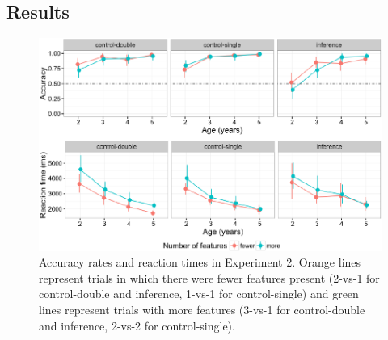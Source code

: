 \documentclass[a4paper,man,apacite,floatsintext]{apa6}
\newenvironment{CodeChunk}{}{}
\begin{document}
\subsection{Results}\label{results-1}

\begin{CodeChunk}
\begin{figure}[H]

{\centering \includegraphics{figs/ipaccrt-1} 

}

\caption[Accuracy rates and reaction times in Experiment 2]{Accuracy rates and reaction times in Experiment 2. Orange lines represent trials in which there were fewer features present (2-vs-1 for control-double and inference, 1-vs-1 for control-single) and green lines represent trials with more features (3-vs-1 for control-double and inference, 2-vs-2 for control-single).}\label{fig:ipaccrt}
\end{figure}
\end{CodeChunk}
\end{document}
